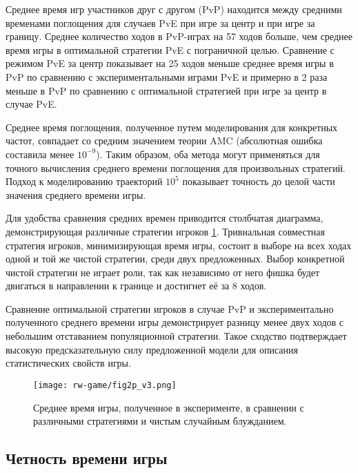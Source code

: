 Среднее время игр участников друг с другом (PvP) находится между средними временами поглощения для случаев PvE при игре за центр и при игре за границу. Среднее количество ходов в PvP-играх на 57 ходов больше, чем среднее время игры в оптимальной стратегии PvE с пограничной целью. Сравнение с режимом PvE за центр показывает на 25 ходов меньше среднее время игры в PvP по сравнению с экспериментальными играми PvE и примерно в 2 раза меньше в PvP по сравнению с оптимальной стратегией при игре за центр в случае PvE.

Среднее время поглощения, полученное путем моделирования для конкретных частот, совпадает со средним значением теории AMC (абсолютная ошибка составила менее $10^{-9}$). Таким образом, оба метода могут применяться для точного вычисления среднего времени поглощения для произвольных стратегий. Подход к моделированию траекторий $10^5$ показывает точность до целой части значения среднего времени игры.

Для удобства сравнения средних времен приводится столбчатая диаграмма, демонстрирующая различные стратегии игроков \cref{fig:mean-times}. Тривиальная совместная стратегия игроков, минимизирующая время игры, состоит в выборе на всех ходах одной и той же чистой стратегии, среди двух предложенных. Выбор конкретной чистой стратегии не играет роли, так как независимо от него фишка будет двигаться в направлении к границе и достигнет её за 8 ходов. 

Сравнение оптимальной стратегии игроков в случае PvP и экспериментально полученного среднего времени игры демонстрирует разницу менее двух ходов с небольшим отставанием популяционной стратегии. Такое сходство подтверждает высокую предсказательную силу предложенной модели для описания статистических свойств игры.

\begin{figure}[t]
    \centering
    \texttt{[image: rw-game/fig2p\_v3.png]}
    \caption{
        Среднее время игры, полученное в эксперименте, в сравнении с различными стратегиями и чистым случайным блужданием.
    }  
    \label{fig:mean-times}
\end{figure}


\subsection{Четность времени игры}\label{subsec:ch3/sec4/sub2}

